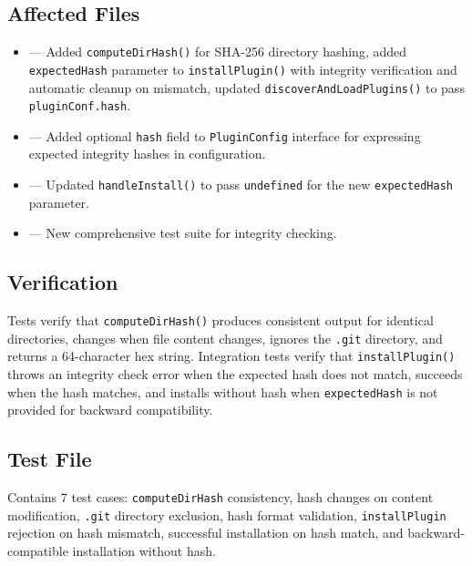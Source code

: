 \subsection*{Affected Files}
\begin{itemize}
    \item {} --- Added \texttt{computeDirHash()} for SHA-256 directory hashing, added \texttt{expectedHash} parameter to \texttt{installPlugin()} with integrity verification and automatic cleanup on mismatch, updated \texttt{discoverAndLoadPlugins()} to pass \texttt{pluginConf.hash}.
    \item {} --- Added optional \texttt{hash} field to \texttt{PluginConfig} interface for expressing expected integrity hashes in configuration.
    \item {} --- Updated \texttt{handleInstall()} to pass \texttt{undefined} for the new \texttt{expectedHash} parameter.
    \item {} --- New comprehensive test suite for integrity checking.
\end{itemize}

\subsection*{Verification}
Tests verify that \texttt{computeDirHash()} produces consistent output for identical directories, changes when file content changes, ignores the \texttt{.git} directory, and returns a 64-character hex string. Integration tests verify that \texttt{installPlugin()} throws an integrity check error when the expected hash does not match, succeeds when the hash matches, and installs without hash when \texttt{expectedHash} is not provided for backward compatibility.

\subsection*{Test File}

Contains 7 test cases: \texttt{computeDirHash} consistency, hash changes on content modification, \texttt{.git} directory exclusion, hash format validation, \texttt{installPlugin} rejection on hash mismatch, successful installation on hash match, and backward-compatible installation without hash.
